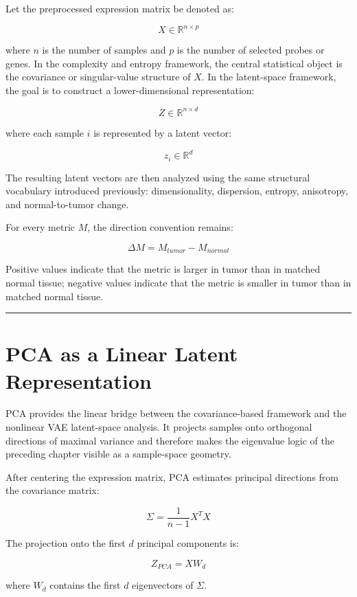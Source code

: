\documentclass[
  letterpaper,
  DIV=11,
  numbers=noendperiod,
  openany,
  oneside]{scrreprt}
\begin{document}
Let the preprocessed expression matrix be denoted as:

\[
X \in \mathbb{R}^{n \times p}
\]

where \(n\) is the number of samples and \(p\) is the number of selected
probes or genes. In the complexity and entropy framework, the central
statistical object is the covariance or singular-value structure of
\(X\). In the latent-space framework, the goal is to construct a
lower-dimensional representation:

\[
Z \in \mathbb{R}^{n \times d}
\]

where each sample \(i\) is represented by a latent vector:

\[
z_i \in \mathbb{R}^{d}
\]

The resulting latent vectors are then analyzed using the same structural
vocabulary introduced previously: dimensionality, dispersion, entropy,
anisotropy, and normal-to-tumor change.

For every metric \(M\), the direction convention remains:

\[
\Delta M = M_{tumor} - M_{normal}
\]

Positive values indicate that the metric is larger in tumor than in
matched normal tissue; negative values indicate that the metric is
smaller in tumor than in matched normal tissue.

\begin{center}\rule{0.5\linewidth}{0.5pt}\end{center}

\section{PCA as a Linear Latent
Representation}\label{pca-as-a-linear-latent-representation}

PCA provides the linear bridge between the covariance-based framework
and the nonlinear VAE latent-space analysis. It projects samples onto
orthogonal directions of maximal variance and therefore makes the
eigenvalue logic of the preceding chapter visible as a sample-space
geometry.

After centering the expression matrix, PCA estimates principal
directions from the covariance matrix:

\[
\Sigma = \frac{1}{n - 1} X^{T}X
\]

The projection onto the first \(d\) principal components is:

\[
Z_{PCA} = XW_d
\]

where \(W_d\) contains the first \(d\) eigenvectors of \(\Sigma\).
\end{document}
